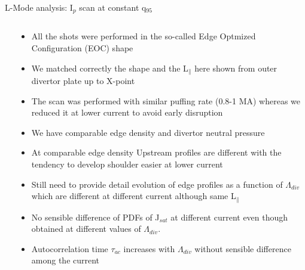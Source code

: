\documentclass[10pt, compress]{beamer}
\newcommand\Fontvi{\fontsize{8}{7.2}\selectfont}
\begin{document}
\begin{frame}{L-Mode analysis: I$_p$ scan at constant q$_{95}$}
\Fontvi
  \vspace{-1cm}
\begin{columns}
  \begin{column}{0.65\textwidth}

  \end{column}
  \begin{column}{0.35\textwidth}
    \begin{itemize}
      \item<1|only@1> All the shots were performed in the so-called
        Edge Optmized Configuration (EOC) shape
      \item<1|only@1> We matched correctly the shape and the L$_{\parallel}$
        here shown from outer divertor plate up to X-point 
      \item<2|only@2> The scan was performed with similar puffing rate (0.8-1
        MA) whereas we reduced it at lower current to avoid early disruption
      \item<2|only@2> We have comparable edge density and divertor neutral
        pressure 
      \item<3|only@3> At comparable edge density Upstream profiles are
        different with the tendency to develop shoulder easier at
        lower current
      \item<3|only@3> Still need to provide detail evolution of edge
        profiles as a function
        of $\Lambda_{div}$ which are different at different current
        although same L$_{\parallel}$
      \item<4|only@4> No sensible difference of PDFs of J$_{sat}$ at
        different current even though obtained at different values of $\Lambda_{div}$. 
      \item<4|only@4> Autocorrelation time $\tau_{ac}$ increases with
        $\Lambda_{div}$ without sensible difference among the current
      \end{itemize}
    \end{column}
\end{columns}
\end{frame}
\end{document}
